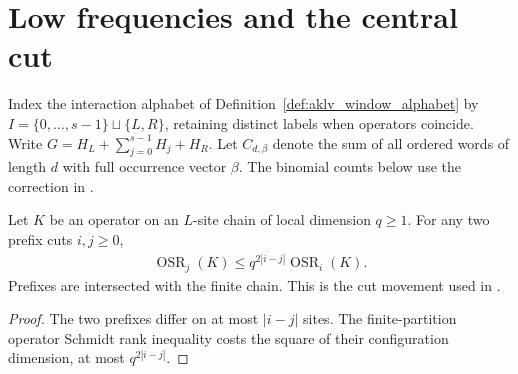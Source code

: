 \section{Low frequencies and the central cut}

Index the interaction alphabet of Definition~\ref{def:aklv_window_alphabet} by
$I=\{0,\ldots,s-1\}\sqcup\{L,R\}$, retaining distinct labels when operators
coincide. Write $G=H_L+\sum_{j=0}^{s-1}H_j+H_R$. Let $C_{d,\beta}$ denote the sum of all ordered
words of length $d$ with full occurrence vector $\beta$.
The binomial counts below use the correction in
\cite{gap:aklv13_interpolation_and_word_count}.

\begin{lemma}
    \label{thm:aklv_cut_transport}
    \leanok
    Let $K$ be an operator on an $L$-site chain of local dimension $q\ge1$.
    For any two prefix cuts $i,j\ge0$,
    \begin{align*}
        \operatorname{OSR}_j(K)\le q^{2|i-j|}\operatorname{OSR}_i(K).
    \end{align*}
    Prefixes are intersected with the finite chain. This is the cut movement
    used in \cite[Lemma~4.2]{Arad2013AreaLaw}.
\end{lemma}
\begin{proof}
    \leanok
    The two prefixes differ on at most $|i-j|$ sites. The finite-partition
    operator Schmidt rank inequality costs the square of their configuration
    dimension, at most $q^{2|i-j|}$.
\end{proof}

